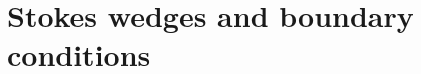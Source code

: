 \documentclass[12pt, a4paper]{report}
\newcommand\PT{\(\mathcal{PT}\)}
\begin{document}



\section*{Stokes wedges and boundary conditions}\label{BCS}






\end{document}
